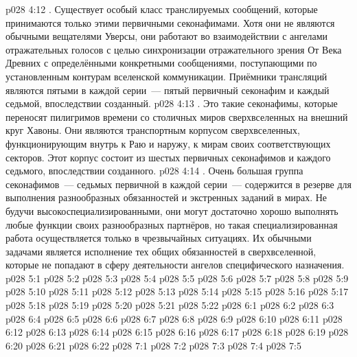 \vs p028 4:12 . Существует особый класс транслируемых сообщений, которые принимаются только этими первичными секонафимами. Хотя они не являются обычными вещателями Уверсы, они работают во взаимодействии с ангелами отражательных голосов с целью синхронизации отражательного зрения От Века Древних с определёнными конкретными сообщениями, поступающими по установленным контурам вселенской коммуникации. Приёмники трансляций являются пятыми в каждой серии~--- пятый первичный секонафим и каждый седьмой, впоследствии созданный.
\vs p028 4:13 . Это такие секонафимы, которые переносят пилигримов времени со столичных миров сверхвселенных на внешний круг Хавоны. Они являются транспортным корпусом сверхвселенных, функционирующим внутрь к Раю и наружу, к мирам своих соответствующих секторов. Этот корпус состоит из шестых первичных секонафимов и каждого седьмого, впоследствии созданного.
\vs p028 4:14 . Очень большая группа секонафимов~--- седьмых первичной в каждой серии~--- содержится в резерве для выполнения разнообразных обязанностей и экстренных заданий в мирах. Не будучи высокоспециализированными, они могут достаточно хорошо выполнять любые функции своих разнообразных партнёров, но такая специализированная работа осуществляется только в чрезвычайных ситуациях. Их обычными задачами является исполнение тех общих обязанностей в сверхвселенной, которые не попадают в сферу деятельности ангелов специфического назначения.
\vs p028 5:1 
\vs p028 5:2 \pc 
\vs p028 5:3 
\vs p028 5:4 
\vs p028 5:5 
\vs p028 5:6 \pc 
\vs p028 5:7 
\vs p028 5:8 
\vs p028 5:9 
\vs p028 5:10 
\vs p028 5:11 
\vs p028 5:12 
\vs p028 5:13 
\vs p028 5:14 \pc 
\vs p028 5:15 
\vs p028 5:16 
\vs p028 5:17 
\vs p028 5:18 
\vs p028 5:19 
\vs p028 5:20 
\vs p028 5:21 
\vs p028 5:22 
\vs p028 6:1 
\vs p028 6:2 
\vs p028 6:3 
\vs p028 6:4 
\vs p028 6:5 
\vs p028 6:6 
\vs p028 6:7 
\vs p028 6:8 \pc 
\vs p028 6:9 
\vs p028 6:10 
\vs p028 6:11 
\vs p028 6:12 
\vs p028 6:13 
\vs p028 6:14 
\vs p028 6:15 \pc 
\vs p028 6:16 
\vs p028 6:17 
\vs p028 6:18 \pc 
\vs p028 6:19 \pc 
\vs p028 6:20 
\vs p028 6:21 
\vs p028 6:22 
\vs p028 7:1 
\vs p028 7:2 \pc 
\vs p028 7:3 
\vs p028 7:4 
\vsetoff
\vs p028 7:5 
\quizlink
